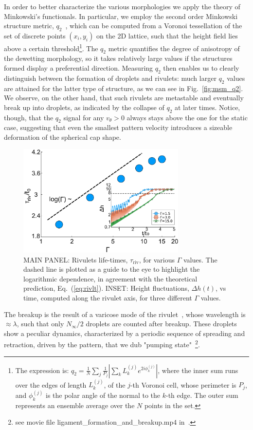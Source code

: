 In order to better characterize the various morphologies we apply the theory of Minkowski's functionals. 
In particular, we employ the second order Minkowski structure metric, $q_2$~\cite{mickelShortcomingsBondOrientational2013, schallerPapaya22DIrreducible2020}, which can be computed from a Voronoi tessellation of the set of discrete points $(x_i, y_i)$ on the 2D lattice, such that the height field lies above a certain threshold\footnote{The expression is: $q_2 = \frac{1}{N}\sum_j \frac{1}{P_j}|\sum_k L^{(j)}_k e^{2i\phi^{(j)}_k}|$, where the inner sum runs over the edges of length $L^{(j)}_k$, of the $j$-th Voronoi cell, whose perimeter is $P_j$, and $\phi^{(j)}_k$ is the polar angle of the normal to the $k$-th edge. 
The outer sum represents an ensemble average over the $N$ points in the set.}. 
The $q_2$ metric quantifies the degree of anisotropy of the dewetting morphology, so it takes relatively large values if the structures formed display a preferential direction. 
Measuring $q_2$ then enables us to clearly distinguish between the formation of droplets and rivulets: much larger $q_2$ values are attained for the latter type of structure, as we can see in Fig.~\ref{fig:msm_q2}.
We observe, on the other hand, that such rivulets are metastable and eventually break up into droplets, as indicated by the collapse of $q_2$ at later times. 
Notice, though, that the $q_2$ signal for any $v_{\theta} >0$ always stays above the one for the static case, suggesting that even the smallest pattern velocity introduces a sizeable deformation of the spherical cap shape.
\begin{figure}
    \centering
    \includegraphics[width=0.75\textwidth]{graphics/Figure_5.pdf}
    \caption{MAIN PANEL: Rivulets life-times, $\tau_{\text{riv}}$, for various $\Gamma$ values.
    The dashed line is plotted as a guide to the eye to highlight the logarithmic dependence, in agreement with the theoretical prediction, Eq.~(\ref{eq:rivlt}).
    INSET: Height fluctuations, $\Delta h(t)$, vs time, computed along the rivulet axis, for three different $\Gamma$ values.
    }
    \label{fig:stab_ligs_lam2}
\end{figure}
The breakup is the result of a varicose mode of the rivulet~\cite{diezBreakupFluidRivulets2009, mechkovStabilityLiquidRidges2008}, whose wavelength is $\approx\lambda$, such that only $N_{\infty}/2$ droplets are counted after breakup. 
These droplets show a peculiar dynamics, characterized by a periodic sequence of spreading and retraction, driven by the pattern, that we dub "pumping state"~\footnote{see movie file ligament\_formation\_and\_breakup.mp4 in~\cite{SuppMat}.}.

